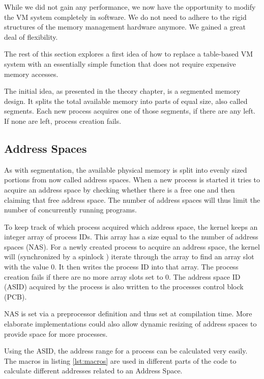 While we did not gain any performance, we now have the opportunity to modify the VM system
completely in software. We do not need to adhere to the rigid structures \cite{tanenbaumOS} of the memory management hardware anymore.
We gained a great deal of flexibility.

The rest of this section explores a first idea of how to replace a table-based VM system with an essentially simple function that does not require expensive memory accesses.

The initial idea, as presented in the theory chapter, is a segmented memory design. It splits the total
available memory into parts of equal size, also called segments.
Each new process acquires one of those segments, if there are any left. If none are left, process creation fails.

\subsection{Address Spaces}
As with segmentation, the available physical memory is split into evenly sized portions \cite{tanenbaumOS}from now called address spaces. When a new process is started it tries to acquire an address space by
checking whether there is a free one and then claiming that free address space.
The number of address spaces will thus limit the number of concurrently running programs.

To keep track of which process acquired which address space, the kernel keeps an integer array of process IDs.
This array has a size equal to the number of address spaces (NAS).
For a newly created process to acquire an address space, the kernel will (synchronized by a spinlock \cite{cox2011xv6})
iterate through the array to find an array slot with the value 0. It then writes the process ID into that array.
The process creation fails if there are no more array slots set to 0.
The address space ID (ASID) acquired by the process is also written to the processes control block (PCB).

NAS is set via a preprocessor definition and thus set at compilation time. More elaborate implementations
could also allow dynamic resizing of address spaces to provide space for more processes.

Using the ASID, the address range for a process can be calculated very easily. The macros in listing \ref{lst:macros}
are used in different parts of the code to calculate different addresses related to an Address Space.

